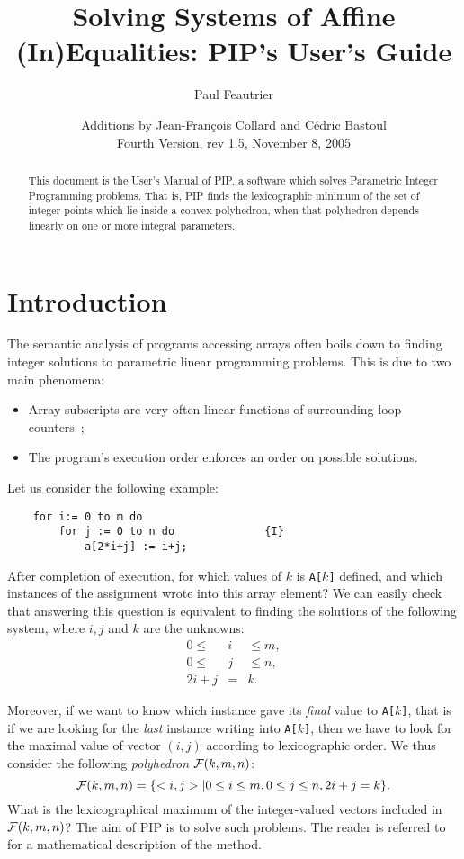 \documentclass[12pt,a4paper,dvips]{article}
\date{Additions by Jean-Fran\c{c}ois Collard and C\'edric Bastoul\\
Fourth Version, rev 1.5, November 8, 2005}
\title{Solving Systems of Affine (In)Equalities: PIP's User's Guide}
\author{Paul Feautrier}
\begin{document}
\pagestyle{headings}

\maketitle


\begin{abstract}
This document is the User's Manual of PIP, a software which solves
Parametric Integer Programming problems. That is, PIP finds the
lexicographic minimum of the set of integer points which lie inside a
convex polyhedron, when that polyhedron depends linearly on one or
more integral parameters. 
\end{abstract}

\section{Introduction}
The semantic analysis of programs accessing arrays often boils down
to finding integer solutions to parametric linear programming problems. This is
due to two main phenomena:
\begin{itemize}
\item Array subscripts are very often linear functions of surrounding loop counters~;
\item The program's execution order enforces an order on possible solutions.
\end{itemize}

Let us consider the following example:
\begin{verbatim}
    for i:= 0 to m do
        for j := 0 to n do              {I}
            a[2*i+j] := i+j;
\end{verbatim}

After completion of execution, for which values of $k$ is {\tt A[}$k${\tt ]}
defined, and which instances of the assignment wrote into
this array element? We can easily check that answering this question
is equivalent to finding the solutions of the following system, where $i,
j$ and $k$ are the unknowns:
\begin{eqnarray}
0 \leq & i & \leq m ,\\
0 \leq & j & \leq n ,\\
2i + j & = & k .
\end{eqnarray}

Moreover, if we want to know which instance gave its {\em final} value
to {\tt A[}$k${\tt ]}, that is if we are looking for the {\em last} instance
writing into {\tt A[}$k${\tt ]}, then we have to look for the maximal value
of vector $(i,j)$ according to lexicographic order. We
thus consider the following {\em polyhedron} ${\cal F}(k, m, n) $:
\begin{equation}
{\cal F}(k, m, n) = \{<i, j>| 0 \leq i \leq m, 0 \leq j \leq n, 2i+j = k\} .
\label{exp1}
\end{equation}
What is the lexicographical maximum of the 
integer-valued vectors included in ${\cal F}(k, m, n)$?
The aim of PIP is to solve such problems. The reader is referred to
\cite{Feau:88b} for a mathematical description of the method.
%
%
\end{document}
